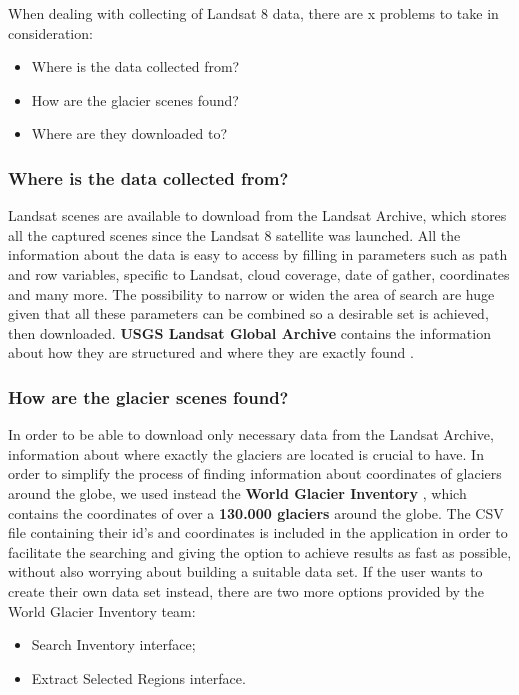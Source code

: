 \documentclass[12pt, a4paper]{report}
\begin{document}
	When dealing with collecting of Landsat 8 data, there are x problems to take in consideration:
	\begin{itemize}
		\item Where is the data collected from?
		\item How are the glacier scenes found?
		\item Where are they downloaded to?
	\end{itemize}
	\subsubsection{Where is the data collected from?}
	Landsat scenes are available to download from the Landsat Archive, which stores all the captured scenes since the Landsat 8 satellite was launched. All the information about the data is easy to access by filling in parameters such as path and row variables, specific to Landsat, cloud coverage, date of gather, coordinates and many more. The possibility to narrow or widen the area of search are huge given that all these parameters can be combined so a desirable set is achieved, then downloaded. \textbf{USGS Landsat Global Archive} contains the information about how they are structured and where they are exactly found \cite{usgs_landsat_archive}.
	
	\subsubsection{How are the glacier scenes found?}
	In order to be able to download only necessary data from the Landsat Archive, information about where exactly the glaciers are located is crucial to have. In order to simplify the process of finding information about coordinates of glaciers around the globe, we used instead the \textbf{World Glacier Inventory} \cite{world_glacier_inventory}, which contains the coordinates of over a \textbf{130.000 glaciers} around the globe. The CSV file containing their id's and coordinates is included in the application in order to facilitate the searching and giving the option to achieve results as fast as possible, without also worrying about building a suitable data set. If the user wants to create their own data set instead, there are two more options provided by the World Glacier Inventory team:
	\begin{itemize}
		\item Search Inventory interface;
		\item Extract Selected Regions interface.
	\end{itemize}
	
\end{document}
